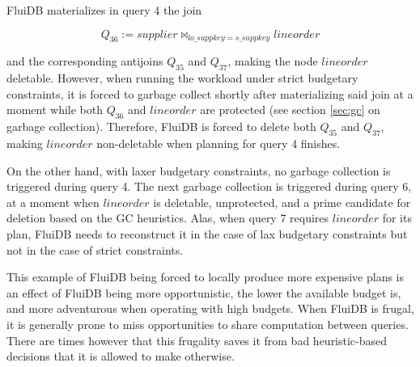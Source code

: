FluiDB materializes in query 4 the join

\[
  Q_{36} := \mathit{supplier} \Join_{\mathit{lo\_suppkey} = \mathit{s\_suppkey}} \mathit{lineorder}
\]

and the corresponding antijoins \(Q_{35}\) and \(Q_{37}\), making the
node \(\mathit{lineorder}\) deletable. However, when running the
workload under strict budgetary constraints, it is forced to garbage
collect shortly after materializing said join at a moment while both
\(Q_{36}\) and \(\mathit{lineorder}\) are protected (see section
\ref{sec:gc} on garbage collection). Therefore, FluiDB is forced to
delete both \(Q_{35}\) and \(Q_{37}\), making \(\mathit{lineorder}\)
non-deletable when planning for query 4 finishes.

On the other hand, with laxer budgetary constraints, no garbage
collection is triggered during query 4. The next garbage collection is
triggered during query 6, at a moment when \(\mathit{lineorder}\) is
deletable, unprotected, and a prime candidate for deletion based on
the GC heuristics. Alas, when query 7 requires \(\mathit{lineorder}\)
for its plan, FluiDB needs to reconstruct it in the case of lax
budgetary constraints but not in the case of strict constraints.

This example of FluiDB being forced to locally produce more expensive
plans is an effect of FluiDB being more opportunistic, the lower the
available budget is, and more adventurous when operating with high
budgets. When FluiDB is frugal, it is generally prone to miss
opportunities to share computation between queries. There are times
however that this frugality saves it from bad heuristic-based
decisions that it is allowed to make otherwise.


